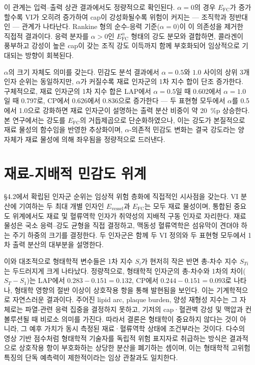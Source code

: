 \documentclass[master,english,final]{kaist-ucs}
\begin{document}
이 관계는 입력--출력 상관 결과에서도 정량적으로 확인된다. $\alpha=0$의 경우 $E_\mathrm{FC}$가 증가할수록 VI가 오히려 증가하여 cap이 강성화될수록 위험이 커지는 --- 조직학과 정반대인 --- 관계가 나타난다. Rankine 형의 순수-응력 기준($\alpha=0$)이 이 의존성을 제거한 직접적 결과이다. 응력 분자를 $\alpha>0$인 $E_\mathrm{FC}^\alpha$ 형태의 강도 분모와 결합하면, 콜라겐이 풍부하고 강성이 높은 cap이 갖는 조직 강도 이득까지 함께 부호화되어 임상적으로 기대되는 방향이 회복된다.

$\alpha$의 크기 자체도 의미를 갖는다. 민감도 분석 결과에서 $\alpha=0.5$와 $1.0$ 사이의 상위 3개 인자 순위는 동일하지만, $\alpha$가 커질수록 재료 인자군의 1차 지수 합이 단조 증가한다. 구체적으로, 재료 인자군의 1차 지수 합은 LAP에서 $\alpha=0.5$일 때 0.602에서 $\alpha=1.0$일 때 0.797로, CP에서 0.626에서 0.836으로 증가한다 --- 두 표현형 모두에서 $\alpha$를 0.5에서 1.0으로 강화하면 재료 인자군이 설명하는 출력 분산 비중이 약 20~\%p 상승한다. 본 연구에서는 강도를 $E_\mathrm{FC}$의 거듭제곱으로 단순화하였으나, 이는 강도가 본질적으로 재료 물성의 함수임을 반영한 추상화이며, $\alpha$-의존적 민감도 변화는 결국 강도라는 양 자체가 재료 물성에 의해 좌우됨을 정량적으로 드러낸다.

\section{재료-지배적 민감도 위계}

\S4.2에서 확립된 인자군 순위는 임상적 위험 층화에 직접적인 시사점을 갖는다. VI 분산에 기여하는 두 최대 개별 인자인 $E_\mathrm{vessel}$과 $E_\mathrm{FC}$는 모두 재료 물성이며, 통합된 중요도 위계에서도 재료 및 혈류역학 인자가 취약성의 지배적 구동 인자로 자리한다. 재료 물성은 국소 응력--강도 균형을 직접 결정하고, 맥동성 혈류역학은 섬유막이 견뎌야 하는 주기 하중의 크기를 결정한다. 두 인자군은 함께 두 VI 정의와 두 표현형 모두에서 1차 출력 분산의 대부분을 설명한다.

이와 대조적으로 형태학적 변수들은 1차 지수 $S_i$가 현저히 작은 반면 총-차수 지수 $S_{Ti}$는 두드러지게 크게 나타났다. 정량적으로, 형태학적 인자군의 총-차수와 1차의 차이($S_T - S_1$)는 LAP에서 $0.283 - 0.151 = 0.132$, CP에서 $0.244 - 0.151 = 0.093$로 나타나, 형태학 영향의 절반 이상이 상호작용 항을 통해 발현됨을 보인다. 이는 기계학적으로 자연스러운 결과이다. 주어진 lipid arc, plaque burden, 양성 재형성 지수는 그 자체로는 파열-관련 응력 집중을 결정하지 못하고, 기저의 cap·혈관벽 강성 및 맥압과 컨볼루션될 때 비로소 의미를 가진다. 따라서 결론은 형태학이 중요하지 않다는 것이 아니라, 그 예후 가치가 동시 측정된 재료·혈류역학 상태에 조건부라는 것이다. 다수의 영상 기반 점수처럼 형태학적 기술자를 독립적 위험 표지자로 취급하는 방식은 결과적으로 상호작용 항이 부호화하는 상당한 분산을 폐기하는 셈이며, 이는 형태학적 고위험 특징의 단독 예측력이 제한적이라는 임상 관찰과도 일치한다.
\end{document}
